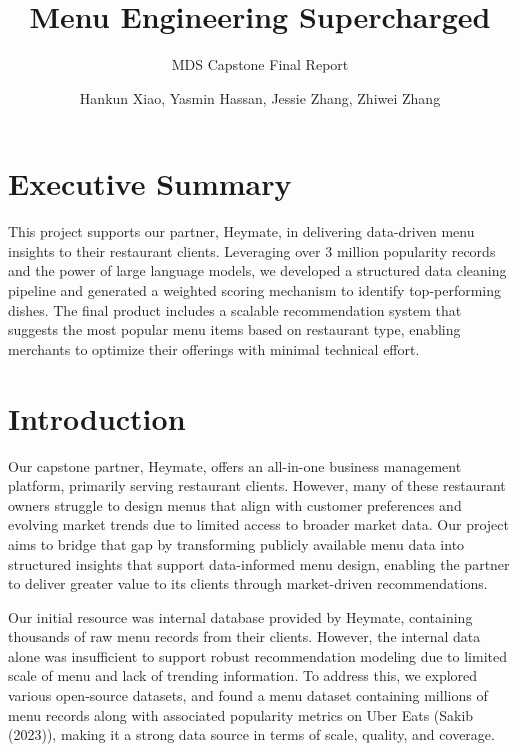 \documentclass[
  11pt,
  a4paper,
  DIV=11,
  numbers=noendperiod]{scrartcl}
\title{Menu Engineering Supercharged}
\subtitle{MDS Capstone Final Report}
\author{Hankun Xiao, Yasmin Hassan, Jessie Zhang, Zhiwei Zhang}
\date{}
\renewcommand*\contentsname{Table of contents}
\newcommand\contentsname{Table of contents}
\begin{document}
\maketitle

\renewcommand*\contentsname{Table of contents}
{
\hypersetup{linkcolor=}
\setcounter{tocdepth}{2}
\tableofcontents
}

\section{Executive Summary}\label{executive-summary}

This project supports our partner, Heymate, in delivering data-driven
menu insights to their restaurant clients. Leveraging over 3 million
popularity records and the power of large language models, we developed
a structured data cleaning pipeline and generated a weighted scoring
mechanism to identify top-performing dishes. The final product includes
a scalable recommendation system that suggests the most popular menu
items based on restaurant type, enabling merchants to optimize their
offerings with minimal technical effort.

\section{Introduction}\label{introduction}

Our capstone partner, Heymate, offers an all-in-one business management
platform, primarily serving restaurant clients. However, many of these
restaurant owners struggle to design menus that align with customer
preferences and evolving market trends due to limited access to broader
market data. Our project aims to bridge that gap by transforming
publicly available menu data into structured insights that support
data-informed menu design, enabling the partner to deliver greater value
to its clients through market-driven recommendations.

Our initial resource was internal database provided by Heymate,
containing thousands of raw menu records from their clients. However,
the internal data alone was insufficient to support robust
recommendation modeling due to limited scale of menu and lack of
trending information. To address this, we explored various open-source
datasets, and found a menu dataset containing millions of menu records
along with associated popularity metrics on Uber Eats (Sakib (2023)),
making it a strong data source in terms of scale, quality, and coverage.
\end{document}
